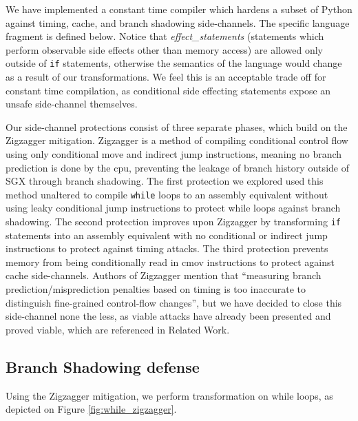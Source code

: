 \documentclass[sigplan, review]{acmart}
\begin{document}
We have implemented a constant time compiler which hardens a subset of Python against timing, cache, and branch shadowing side-channels. The specific language fragment is defined below. Notice that \textit{effect\_statements} (statements which perform observable side effects other than memory access) are allowed only outside of \texttt{if} statements, otherwise the semantics of the language would change as a result of our transformations. We feel this is an acceptable trade off for constant time compilation, as conditional side effecting statements expose an unsafe side-channel themselves.

Our side-channel protections consist of three separate phases, which build on the Zigzagger \cite{lee2016inferring} mitigation. Zigzagger is a method of compiling conditional control flow using only conditional move and indirect jump instructions, meaning no branch prediction is done by the cpu, preventing the leakage of branch history outside of SGX through branch shadowing. The first protection we explored used this method unaltered to compile \texttt{while} loops to an assembly equivalent without using leaky conditional jump instructions to protect while loops against branch shadowing. The second protection improves upon Zigzagger by transforming \texttt{if} statements into an assembly equivalent with no conditional or indirect jump instructions to protect against timing attacks. The third protection prevents memory from being conditionally read in cmov instructions to protect against cache side-channels. Authors of Zigzagger mention that “measuring branch prediction/misprediction penalties based on timing is too inaccurate to distinguish fine-grained control-flow changes”, but we have decided to close this side-channel none the less, as viable attacks have already been presented and proved viable, which are referenced in Related Work.

\subsection{Branch Shadowing defense}
Using the Zigzagger mitigation, we perform transformation on while loops, as depicted on Figure \ref{fig:while_zigzagger}.
\end{document}
